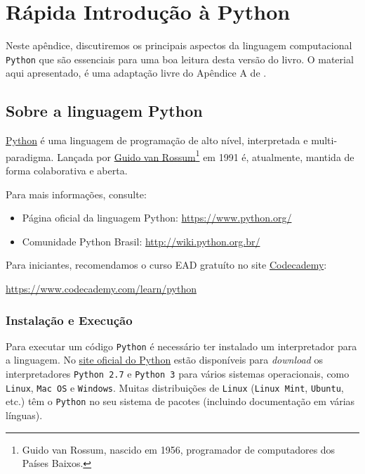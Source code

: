 
\chapter{Rápida Introdução à Python}\label{cap:python}

Neste apêndice, discutiremos os principais aspectos da linguagem computacional \verb+Python+ que são essenciais para uma boa leitura desta versão do livro. O material aqui apresentado, é uma adaptação livre do Apêndice A de \cite{CALSCI}.

\section{Sobre a linguagem Python}

\href{https://www.python.org/}{Python} é uma linguagem de programação de alto nível, interpretada e multi-paradigma. Lançada por \href{https://gvanrossum.github.io//}{Guido van Rossum}\footnote{Guido van Rossum, nascido em 1956, programador de computadores dos Países Baixos.} em 1991 é, atualmente, mantida de forma colaborativa e aberta.

Para mais informações, consulte:
\begin{itemize}
\item Página oficial da linguagem Python: \url{https://www.python.org/}
\item Comunidade Python Brasil: \url{http://wiki.python.org.br/}
\end{itemize}

Para iniciantes, recomendamos o curso EAD gratuíto no site \href{https://www.codecademy.com/}{Codecademy}:
\begin{center}
  \url{https://www.codecademy.com/learn/python}
\end{center}

\subsection{Instalação e Execução}

Para executar um código \verb+Python+ é necessário ter instalado um interpretador para a linguagem. No \href{https://www.python.org/}{site oficial do Python} estão disponíveis para {\it download} os interpretadores \verb+Python 2.7+ e \verb+Python 3+ para vários sistemas operacionais, como \verb+Linux+, \verb+Mac OS+ e \verb+Windows+. Muitas distribuições de \verb+Linux+ (\verb+Linux Mint+, \verb+Ubuntu+, etc.) têm o \verb+Python+ no seu sistema de pacotes (incluindo documentação em várias línguas).

